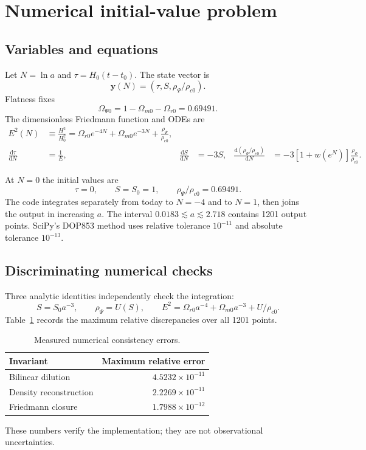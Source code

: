 \documentclass[11pt]{article}
\newcommand{\dd}{\mathrm{d}}
\begin{document}
\section{Numerical initial-value problem}

\subsection{Variables and equations}

Let $N=\ln a$ and $\tau=H_0(t-t_0)$.  The state vector is
\begin{equation}
  \mathbf y(N)=\left(\tau,S,\rho_\Psi/\rho_{c0}\right).
\end{equation}
Flatness fixes
\begin{equation}
  \Omega_{\Psi0}=1-\Omega_{m0}-\Omega_{r0}=0.69491.
\end{equation}
The dimensionless Friedmann function and ODEs are
\begin{align}
E^2(N)&\equiv\frac{H^2}{H_0^2}
=\Omega_{r0}e^{-4N}+\Omega_{m0}e^{-3N}
+\frac{\rho_\Psi}{\rho_{c0}},
\label{eq:friedmann}\\
\frac{\dd\tau}{\dd N}&=\frac1E,
&\frac{\dd S}{\dd N}&=-3S,
&\frac{\dd(\rho_\Psi/\rho_{c0})}{\dd N}
&=-3[1+w(e^N)]\frac{\rho_\Psi}{\rho_{c0}}.
\label{eq:odes}
\end{align}

At $N=0$ the initial values are
\begin{equation}
  \tau=0,
  \qquad S=S_0=1,
  \qquad \rho_\Psi/\rho_{c0}=0.69491.
\end{equation}
The code integrates separately from today to $N=-4$ and to $N=1$, then joins
the output in increasing $a$.  The interval
$0.0183\lesssim a\lesssim2.718$ contains 1201 output points.  SciPy's DOP853
method uses relative tolerance $10^{-11}$ and absolute tolerance $10^{-13}$.

\subsection{Discriminating numerical checks}

Three analytic identities independently check the integration:
\begin{equation}
  S=S_0a^{-3},
  \qquad
  \rho_\Psi=U(S),
  \qquad
  E^2=\Omega_{r0}a^{-4}+\Omega_{m0}a^{-3}+U/\rho_{c0}.
\end{equation}
Table~\ref{tab:errors} records the maximum relative discrepancies over all
1201 points.

\begin{table}[ht]
\centering
\caption{Measured numerical consistency errors.}
\label{tab:errors}
\begin{tabular}{@{}lr@{}}
\toprule
Invariant & Maximum relative error \\
\midrule
Bilinear dilution & $4.5232\times10^{-11}$ \\
Density reconstruction & $2.2269\times10^{-11}$ \\
Friedmann closure & $1.7988\times10^{-12}$ \\
\bottomrule
\end{tabular}
\end{table}
These numbers verify the implementation; they are not observational
uncertainties.
\end{document}
